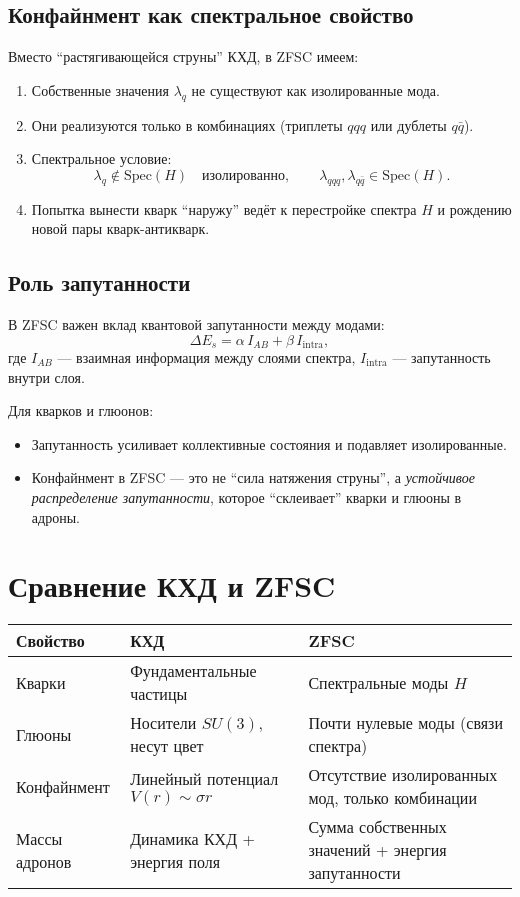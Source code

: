\documentclass[12pt,a4paper]{article}
\begin{document}
\subsection*{Конфайнмент как спектральное свойство}
Вместо ``растягивающейся струны'' КХД, в ZFSC имеем:
\begin{enumerate}
  \item Собственные значения $\lambda_q$ не существуют как изолированные мода.  
  \item Они реализуются только в комбинациях (триплеты $qqq$ или дублеты $q\bar q$).  
  \item Спектральное условие:
  \[
  \lambda_q \notin \mathrm{Spec}(H) \quad \text{изолированно}, \qquad
  \lambda_{qqq}, \lambda_{q\bar q} \in \mathrm{Spec}(H).
  \]
  \item Попытка вынести кварк ``наружу'' ведёт к перестройке спектра $H$ и рождению новой пары кварк-антикварк.
\end{enumerate}

\subsection*{Роль запутанности}
В ZFSC важен вклад квантовой запутанности между модами:
\[
\Delta E_s = \alpha \, I_{AB} + \beta \, I_{\mathrm{intra}},
\]
где $I_{AB}$ --- взаимная информация между слоями спектра, $I_{\mathrm{intra}}$ --- запутанность внутри слоя.

Для кварков и глюонов:
\begin{itemize}
  \item Запутанность усиливает коллективные состояния и подавляет изолированные.  
  \item Конфайнмент в ZFSC --- это не ``сила натяжения струны'', а \emph{устойчивое распределение запутанности}, которое ``склеивает'' кварки и глюоны в адроны.  
\end{itemize}

\section*{Сравнение КХД и ZFSC}
\begin{tabular}{|l|l|l|}
\hline
Свойство & КХД & ZFSC \\ \hline
Кварки & Фундаментальные частицы & Спектральные моды $H$ \\ \hline
Глюоны & Носители $SU(3)$, несут цвет & Почти нулевые моды (связи спектра) \\ \hline
Конфайнмент & Линейный потенциал $V(r)\sim \sigma r$ & Отсутствие изолированных мод, только комбинации \\ \hline
Массы адронов & Динамика КХД + энергия поля & Сумма собственных значений + энергия запутанности \\ \hline
\end{tabular}
\end{document}

